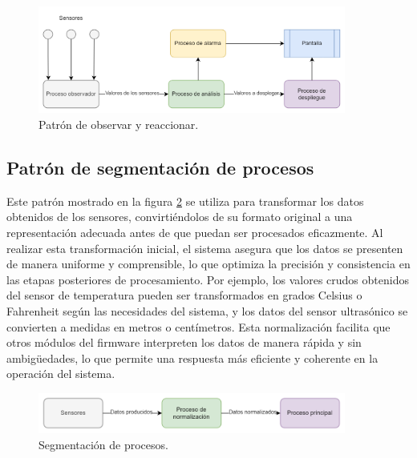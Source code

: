 \vspace{1cm}
\begin{figure}[htbp]
	\centering
	\includegraphics[width=0.9\textwidth, height=0.3\textheight]{./Figures/patron_de_observar_y_reaccionar.png}
	\caption{Patrón de observar y reaccionar.}
	\label{fig:patron_de_observar_y_reaccionar}
\end{figure}
\vspace{1cm}

\newpage

\subsection{Patrón de segmentación de procesos}

Este patrón mostrado en la figura \ref{fig:segmentacion_de_procesos} se utiliza para transformar los datos obtenidos de los sensores, convirtiéndolos de su formato original a una representación adecuada antes de que puedan ser procesados eficazmente. Al realizar esta transformación inicial, el sistema asegura que los datos se presenten de manera uniforme y comprensible, lo que optimiza la precisión y consistencia en las etapas posteriores de procesamiento. Por ejemplo, los valores crudos obtenidos del sensor de temperatura pueden ser transformados en grados Celsius o Fahrenheit según las necesidades del sistema, y los datos del sensor ultrasónico se convierten a medidas en metros o centímetros. Esta normalización facilita que otros módulos del firmware interpreten los datos de manera rápida y sin ambigüedades, lo que permite una respuesta más eficiente y coherente en la operación del sistema.

\vspace{1cm}
\begin{figure}[htbp]
	\centering
	\includegraphics[width=0.9\textwidth, height=0.1\textheight]{./Figures/segmentacion_de_procesos.png}
	\caption{Segmentación de procesos.}
	\label{fig:segmentacion_de_procesos}
\end{figure}
\vspace{1cm}

